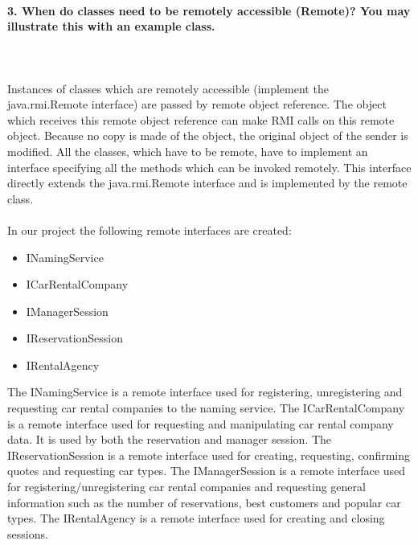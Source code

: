 \documentclass{ds-report}
\begin{document}
	\paragraph{3. When do classes need to be remotely accessible (Remote)? You may illustrate this with an example
class.} \mbox{}\\\\
Instances of classes which are remotely accessible (implement the java.rmi.Remote interface) are passed by remote object reference. The object which receives this remote object reference can make RMI calls on this remote object. Because no copy is made of the object, the original object of the sender is modified. All the classes, which have to be remote, have to implement an interface specifying all the methods which can be invoked remotely. This interface directly extends the java.rmi.Remote interface and is implemented by the remote class.\\\\
In our project the following remote interfaces are created:
\begin{itemize}
	\item INamingService
	\item ICarRentalCompany
	\item IManagerSession
	\item IReservationSession
	\item IRentalAgency
\end{itemize} 
The INamingService is a remote interface used for registering, unregistering and requesting car rental companies to the naming service. The ICarRentalCompany is a remote interface used for requesting and manipulating car rental company data. It is used by both the reservation and manager session. The IReservationSession is a remote interface used for creating, requesting, confirming quotes and requesting car types. The IManagerSession is a remote interface used for registering/unregistering car rental companies and requesting general information such as the number of reservations, best customers and popular car types. The IRentalAgency is a remote interface used for creating and closing sessions.
\end{document}
